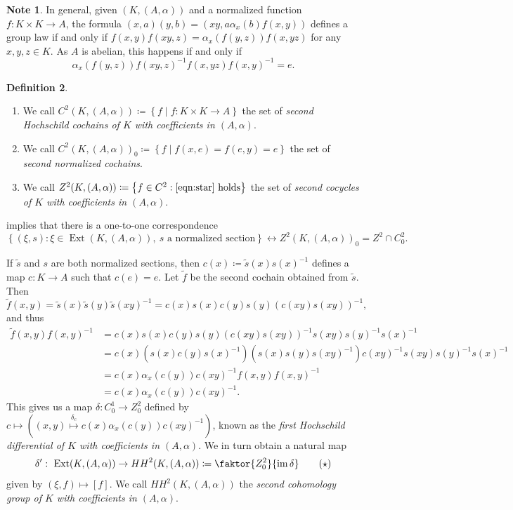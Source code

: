 \documentclass[10pt,letterpaper,cm]{nupset}
\theoremstyle{definition}
\newtheorem{definition}{Definition}[subsection]
\newtheorem{note}[definition]{Note}
\theoremstyle{theorem}
\theoremstyle{remark}
\newcommand{\1}{\mathbf{1}}
\newcommand{\0}{\vec 0}
\DeclareMathOperator{\ext}{Ext}
\DeclareMathOperator{\im}{im}
\begin{document}
\begin{note}\label{lr}
In general, given $\left(K, \left(A, \alpha\right)\right)$ and a normalized function $f: K \times K \to A$, the formula $\left(x, a\right)\left(y, b\right) = \left(xy, a \alpha_x(b)f(x,y)\right)$ defines a group law if and only if $f(x,y)f(xy, z) = \alpha_x(f(y,z))f(x, yz)$ for any $x, y, z \in K$. As $A$ is abelian, this happens if and only if  
\[ \label{eqn:star}
\alpha_x(f(y, z))f(xy, z)^{-1} f(x, yz)f(x, y)^{-1} = e. \tag{$\ast$}
\]
\end{note}

\begin{definition} $ $
\begin{enumerate}
\item We call $C^2(K, (A, \alpha))\coloneqq  \left\{f \mid f: K \times K \to A\right\}$ the set of \textit{second Hochschild cochains of $K$ with coefficients in $\left(A, \alpha\right)$}. 
\item We call $C^2(K, (A, \alpha))_0 \coloneqq  \left\{f \mid f(x, e) = f(e, y) =e\right\}$ the set of \textit{second normalized cochains}.
\item We call $Z^2(K, (A, \alpha)) \coloneqq  \left\{f \in C^2 : \eqref{eqn:star} \text{ holds}\right\}$ the set of \textit{second cocycles of $K$ with coefficients in $\left(A, \alpha\right)$}.
\end{enumerate}
\end{definition}


 implies that there is a one-to-one correspondence 
\[
\left\{\left(\xi, s\right) : \xi \in \ext(K, (A, \alpha)), \ \text{$s$ a normalized section}\right\} \longleftrightarrow Z^2(K, (A, \alpha))_0 = Z^2 \cap C^2_0
.\]

If $\tilde{s}$ and $s$ are both normalized sections, then $c(x)\coloneqq \tilde{s}(x)s(x)^{-1}$ defines a map $c : K \to A$ such that $c(e) =e$. Let $\tilde{f}$ be the second cochain obtained from $\tilde{s}$. Then  $$\tilde{f}(x, y) = \tilde{s}(x)\tilde{s}(y)\tilde{s}(xy)^{-1} =c(x)s(x)c(y)s(y)(c(xy)s(xy))^{-1}, $$ and thus 
\begin{align*} \tilde{f}(x, y)f(x,y)^{-1} & = c(x)s(x)c(y)s(y)(c(xy)s(xy))^{-1}s(xy)s(y)^{-1}s(x)^{-1}
\\ &  = c(x)(s(x)c(y)s(x)^{-1})(s(x)s(y)s(xy)^{-1})c(xy)^{-1}s(xy)s(y)^{-1}s(x)^{-1}
\\ &  = c(x)\alpha_x(c(y))c(xy)^{-1}f(x,y)f(x,y)^{-1} 
\\ & =c(x)\alpha_x(c(y))c(xy)^{-1}.
\end{align*}
This gives us a map $\delta: C^1_0 \to Z^2_0$ defined by $c \mapsto \left((x, y) \overset{\delta_c}{\longmapsto}   c(x)\alpha_x(c(y))c(xy)^{-1}\right)$, known as the \textit{first Hochschild differential of $K$ with coefficients in $\left(A, \alpha\right)$}.  
We in turn obtain a natural map 
\[\label{eqn:HH}
\delta':\ \ext(K, (A, \alpha)) \to {HH}^2(K, (A, \alpha)) \coloneqq  \faktor{Z^2_0}{\im{\delta}}
\tag{$\star$}
\] given by $\left(\xi, f\right) \mapsto [f]$. We call ${HH}^2(K, (A, \alpha))$ the \textit{second cohomology group of $K$ with coefficients in $\left(A, \alpha\right)$}.
\end{document}
